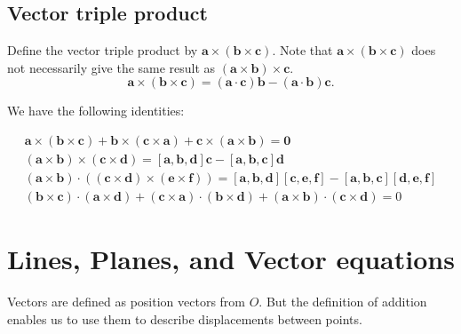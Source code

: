\documentclass[10pt]{article}
\begin{document}
    \subsection{Vector triple product}
    \begin{definition}
        Define the vector triple product by $ \mathbf{a}\times (\mathbf{b}\times \mathbf{c}) $. Note that $ \mathbf{a}\times (\mathbf{b}\times \mathbf{c}) $ does not necessarily give the same result as $ (\mathbf{a}\times \mathbf{b})\times \mathbf{c} $.
        \begin{equation}\label{eq:vector triple prod identity}
            \mathbf{a}\times (\mathbf{b}\times \mathbf{c})=(\mathbf{a}\cdot \mathbf{c})\mathbf{b}-(\mathbf{a}\cdot \mathbf{b})\mathbf{c}.
        \end{equation}
    \end{definition}
    We have the following identities:
    \begin{proposition}\label{prop:triple}
        \[
            \begin{array}{l}
                \mathbf{a} \times(\mathbf{b} \times \mathbf{c})+\mathbf{b} \times(\mathbf{c} \times \mathbf{a})+\mathbf{c} \times(\mathbf{a} \times \mathbf{b})=\mathbf{0} \\
                (\mathbf{a} \times \mathbf{b}) \times(\mathbf{c} \times \mathbf{d})=[\mathbf{a}, \mathbf{b}, \mathbf{d}] \mathbf{c}-[\mathbf{a}, \mathbf{b}, \mathbf{c}] \mathbf{d} \\
                (\mathbf{a} \times \mathbf{b}) \cdot((\mathbf{c} \times \mathbf{d}) \times(\mathbf{e} \times \mathbf{f}))=[\mathbf{a}, \mathbf{b}, \mathbf{d}][\mathbf{c}, \mathbf{e}, \mathbf{f}]-[\mathbf{a}, \mathbf{b}, \mathbf{c}][\mathbf{d}, \mathbf{e}, \mathbf{f}] \\
                (\mathbf{b} \times \mathbf{c}) \cdot(\mathbf{a} \times \mathbf{d})+(\mathbf{c} \times \mathbf{a}) \cdot(\mathbf{b} \times \mathbf{d})+(\mathbf{a} \times \mathbf{b}) \cdot(\mathbf{c} \times \mathbf{d})=0
                \end{array}
        \]
    \end{proposition}
    \section{Lines, Planes, and Vector equations}
    Vectors are defined as position vectors from $O$. But the definition of addition enables us to use them to describe displacements between points.
\end{document}
